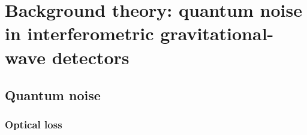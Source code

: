 \chapter{Background theory: quantum noise in interferometric gravitational-wave detectors} %







\section{Quantum noise}






\subsection{Optical loss}



